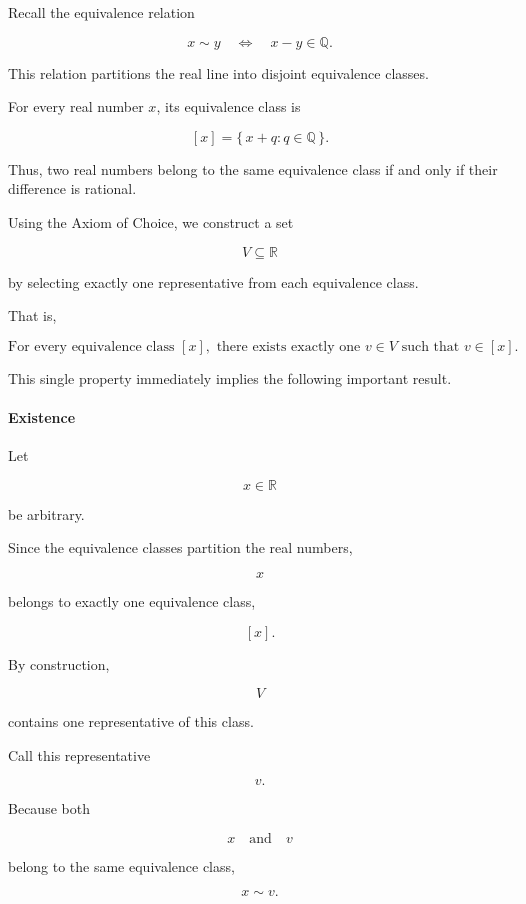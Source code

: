 \documentclass[11pt]{article}
\begin{document}
	Recall the equivalence relation
	
	\[
	x\sim y
	\quad\Longleftrightarrow\quad
	x-y\in\mathbb Q.
	\]
	
	This relation partitions the real line into disjoint equivalence classes.
	
	For every real number \(x\), its equivalence class is
	
	\[
	[x]
	=
	\{\,x+q:q\in\mathbb Q\,\}.
	\]
	
	Thus, two real numbers belong to the same equivalence class if and only if
	their difference is rational.
	
	\bigskip
	
	Using the Axiom of Choice, we construct a set
	
	\[
	V\subseteq\mathbb R
	\]
	
	by selecting exactly one representative from each equivalence class.
	
	That is,
	
	\[
	\boxed{
		\text{For every equivalence class }[x],
		\text{ there exists exactly one }
		v\in V
		\text{ such that }
		v\in[x].
	}
	\]
	
	This single property immediately implies the following important result.
	
	\bigskip
	
	\paragraph{Existence}
	
	Let
	
	\[
	x\in\mathbb R
	\]
	
	be arbitrary.
	
	Since the equivalence classes partition the real numbers,
	
	\[
	x
	\]
	
	belongs to exactly one equivalence class,
	
	\[
	[x].
	\]
	
	By construction,
	
	\[
	V
	\]
	
	contains one representative of this class.
	
	Call this representative
	
	\[
	v.
	\]
	
	Because both
	
	\[
	x
	\quad\text{and}\quad
	v
	\]
	
	belong to the same equivalence class,
	
	\[
	x\sim v.
	\]
	
\end{document}
